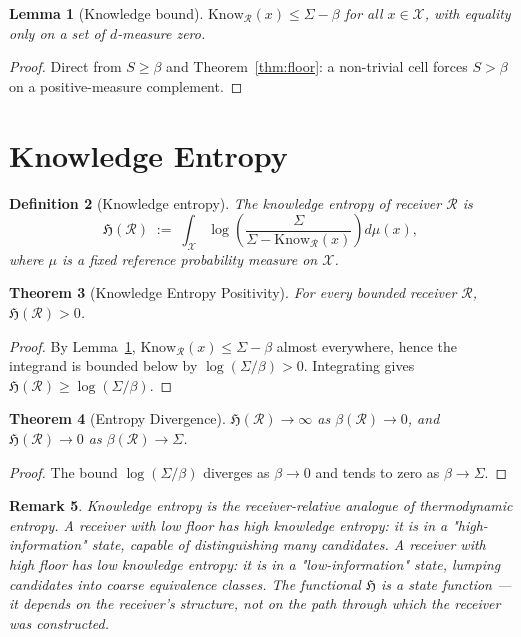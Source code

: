 \documentclass[11pt,a4paper]{article}
\newtheorem{theorem}{Theorem}[section]
\newtheorem{lemma}[theorem]{Lemma}
\newtheorem{definition}[theorem]{Definition}
\newtheorem{remark}[theorem]{Remark}
\newcommand{\Cands}{\mathcal{X}}
\newcommand{\receiver}{\mathcal{R}}
\newcommand{\Sigmax}{\Sigma}
\newcommand{\Sscalar}{S}
\newcommand{\Know}{\mathrm{Know}}
\newcommand{\Hknow}{\mathfrak{H}}
\begin{document}
\begin{lemma}[Knowledge bound]
\label{lem:know-bound}
$\Know_{\receiver}(x) \leq \Sigmax - \beta$ for all $x \in \Cands$, with equality only on a set of $d$-measure zero.
\end{lemma}

\begin{proof}
Direct from $\Sscalar \geq \beta$ and Theorem~\ref{thm:floor}: a non-trivial cell forces $\Sscalar > \beta$ on a positive-measure complement.
\end{proof}

\section{Knowledge Entropy}
\label{sec:knowledge-entropy}

\begin{definition}[Knowledge entropy]
\label{def:knowledge-entropy}
The \emph{knowledge entropy} of receiver $\receiver$ is
\[
\Hknow(\receiver) \;:=\; \int_{\Cands} \log\left(\frac{\Sigmax}{\Sigmax - \Know_{\receiver}(x)}\right) d\mu(x),
\]
where $\mu$ is a fixed reference probability measure on $\Cands$.
\end{definition}

\begin{theorem}[Knowledge Entropy Positivity]
\label{thm:know-entropy-positive}
For every bounded receiver $\receiver$, $\Hknow(\receiver) > 0$.
\end{theorem}

\begin{proof}
By Lemma~\ref{lem:know-bound}, $\Know_{\receiver}(x) \leq \Sigmax - \beta$ almost everywhere, hence the integrand is bounded below by $\log(\Sigmax/\beta) > 0$. Integrating gives $\Hknow(\receiver) \geq \log(\Sigmax/\beta)$.
\end{proof}

\begin{theorem}[Entropy Divergence]
\label{thm:entropy-divergence}
$\Hknow(\receiver) \to \infty$ as $\beta(\receiver) \to 0$, and $\Hknow(\receiver) \to 0$ as $\beta(\receiver) \to \Sigmax$.
\end{theorem}

\begin{proof}
The bound $\log(\Sigmax/\beta)$ diverges as $\beta \to 0$ and tends to zero as $\beta \to \Sigmax$.
\end{proof}

\begin{remark}
\label{rem:entropy-thermodynamic}
Knowledge entropy is the receiver-relative analogue of thermodynamic entropy. A receiver with low floor has high knowledge entropy: it is in a "high-information" state, capable of distinguishing many candidates. A receiver with high floor has low knowledge entropy: it is in a "low-information" state, lumping candidates into coarse equivalence classes. The functional $\Hknow$ is a state function — it depends on the receiver's structure, not on the path through which the receiver was constructed.
\end{remark}
\end{document}
